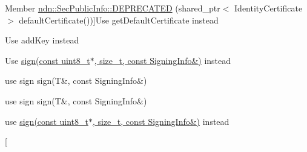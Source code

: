 \begin{DoxyRefList}
\hypertarget{deprecated__deprecated000037}{}%
Member \hyperlink{classndn_1_1SecPublicInfo_aaa46b29c93a85f656a133679e8bb9e01}{ndn\+:\+:Sec\+Public\+Info\+:\+:D\+E\+P\+R\+E\+C\+A\+T\+ED} (shared\+\_\+ptr$<$ Identity\+Certificate $>$ default\+Certificate())]Use get\+Default\+Certificate instead  
\item[\label{deprecated__deprecated000036}%
\hypertarget{deprecated__deprecated000036}{}%
Member \hyperlink{classndn_1_1SecPublicInfo_a1c22efbb05dad48fdac5d7a3ac2b5619}{ndn\+:\+:Sec\+Public\+Info\+:\+:D\+E\+P\+R\+E\+C\+A\+T\+ED} (void add\+Public\+Key(const Name \&key\+Name, Key\+Type key\+Type, const Public\+Key \&public\+Key))]Use add\+Key instead  
\item[\label{deprecated__deprecated000031}%
\hypertarget{deprecated__deprecated000031}{}%
Member \hyperlink{classndn_1_1security_1_1KeyChain_a70cadd2bfce67770acfba02f1a6cf66d}{ndn\+:\+:security\+:\+:Key\+Chain\+:\+:sign} (const uint8\+\_\+t $\ast$buffer, size\+\_\+t buffer\+Length, const \hyperlink{classndn_1_1Name}{Name} \&certificate\+Name)]Use \hyperlink{classndn_1_1security_1_1KeyChain_a92e3ef8eb76208713612370d72187a58}{sign(const uint8\+\_\+t$\ast$, size\+\_\+t, const Signing\+Info\&)} instead  
\item[\label{deprecated__deprecated000030}%
\hypertarget{deprecated__deprecated000030}{}%
Member \hyperlink{classndn_1_1security_1_1KeyChain_a38cd4d4750a9b844953994e0e6731856}{ndn\+:\+:security\+:\+:Key\+Chain\+:\+:sign} (T \&packet, const \hyperlink{classndn_1_1Name}{Name} \&certificate\+Name)]use sign sign(\+T\&, const Signing\+Info\&)  
\item[\label{deprecated__deprecated000032}%
\hypertarget{deprecated__deprecated000032}{}%
Member \hyperlink{classndn_1_1security_1_1KeyChain_a12667fcdf3bef2250eb3b523b1e4f987}{ndn\+:\+:security\+:\+:Key\+Chain\+:\+:sign\+By\+Identity} (T \&packet, const \hyperlink{classndn_1_1Name}{Name} \&identity\+Name)]use sign sign(\+T\&, const Signing\+Info\&)  
\item[\label{deprecated__deprecated000033}%
\hypertarget{deprecated__deprecated000033}{}%
Member \hyperlink{classndn_1_1security_1_1KeyChain_a77e1edd0663bf184deef4be2566c921b}{ndn\+:\+:security\+:\+:Key\+Chain\+:\+:sign\+By\+Identity} (const uint8\+\_\+t $\ast$buffer, size\+\_\+t buffer\+Length, const \hyperlink{classndn_1_1Name}{Name} \&identity\+Name)]use \hyperlink{classndn_1_1security_1_1KeyChain_a92e3ef8eb76208713612370d72187a58}{sign(const uint8\+\_\+t$\ast$, size\+\_\+t, const Signing\+Info\&)} instead  
\item[\label{deprecated__deprecated000034}%

\end{DoxyRefList}
